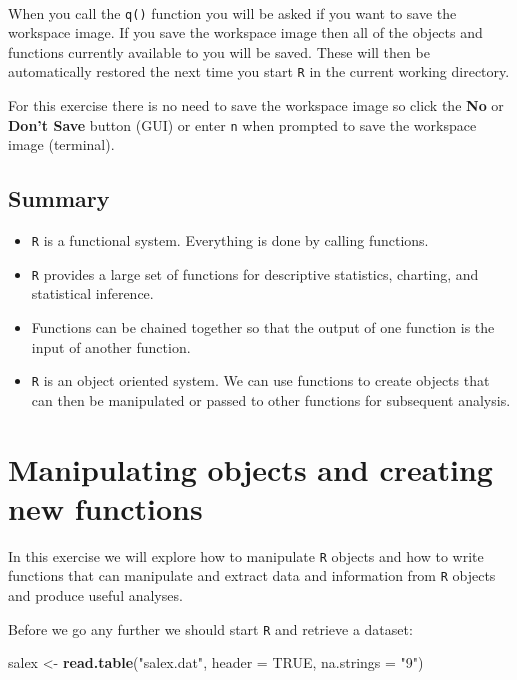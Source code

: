 \documentclass[12pt,a4paper]{book}
\newenvironment{Shaded}{\begin{snugshade}}{\end{snugshade}}
\newcommand{\KeywordTok}[1]{\textcolor[rgb]{0.13,0.29,0.53}{\textbf{#1}}}
\newcommand{\DataTypeTok}[1]{\textcolor[rgb]{0.13,0.29,0.53}{#1}}
\newcommand{\StringTok}[1]{\textcolor[rgb]{0.31,0.60,0.02}{#1}}
\newcommand{\OtherTok}[1]{\textcolor[rgb]{0.56,0.35,0.01}{#1}}
\newcommand{\NormalTok}[1]{#1}
\providecommand{\tightlist}{%
  \setlength{\itemsep}{0pt}\setlength{\parskip}{0pt}}
\theoremstyle{definition}
\theoremstyle{definition}
\theoremstyle{definition}
\theoremstyle{remark}
\begin{document}
~

When you call the \texttt{q()} function you will be asked if you want to
save the workspace image. If you save the workspace image then all of
the objects and functions currently available to you will be saved.
These will then be automatically restored the next time you start
\texttt{R} in the current working directory.

For this exercise there is no need to save the workspace image so click
the \textbf{No} or \textbf{Don't Save} button (GUI) or enter \texttt{n}
when prompted to save the workspace image (terminal).

\hypertarget{summary}{%
\section{Summary}\label{summary}}

\begin{itemize}
\tightlist
\item
  \texttt{R} is a functional system. Everything is done by calling
  functions.
\item
  \texttt{R} provides a large set of functions for descriptive
  statistics, charting, and statistical inference.
\item
  Functions can be chained together so that the output of one function
  is the input of another function.
\item
  \texttt{R} is an object oriented system. We can use functions to
  create objects that can then be manipulated or passed to other
  functions for subsequent analysis.
\end{itemize}

\hypertarget{exercise2}{%
\chapter{Manipulating objects and creating new
functions}\label{exercise2}}

In this exercise we will explore how to manipulate \texttt{R} objects
and how to write functions that can manipulate and extract data and
information from \texttt{R} objects and produce useful analyses.

Before we go any further we should start \texttt{R} and retrieve a
dataset:

\begin{Shaded}
\begin{Highlighting}[]
\NormalTok{salex <-}\StringTok{ }\KeywordTok{read.table}\NormalTok{(}\StringTok{"salex.dat"}\NormalTok{, }\DataTypeTok{header =} \OtherTok{TRUE}\NormalTok{, }\DataTypeTok{na.strings =} \StringTok{"9"}\NormalTok{)}
\end{Highlighting}
\end{Shaded}
\end{document}
